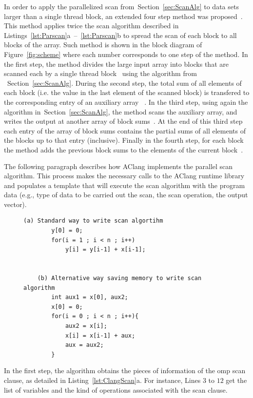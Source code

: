 \documentclass[Ingles]{ic-tese-v1}
\newcommand{\rsec}[1]{Section~\ref{sec:#1}}
\newcommand{\rfig}[1]{Figure~\ref{fig:#1}}
\newcommand{\rlst}[1]{Listing~\ref{lst:#1}}
\newcommand{\rlstn}[3]{Listings~\ref{lst:#1}{#2}~--~\ref{lst:#1}{#3}}
\begin{document}
In order to apply the  parallelized scan from~\rsec{ScanAlg} to data sets
larger than  a single thread block,  an extended four step  method was
proposed~\cite{harris2007parallel}. This method applies twice the  scan
algorithm described in \rlstn{Parscan}{a}{b} to spread the scan of each
block to all blocks  of the array.  Such method is  shown in the block
diagram of \rfig{scheme} where each  number corresponds to one step of
the method.   In the first  step, the  method divides the  large input
array  into  blocks  that  are   scanned  each  by  a  single  thread
block~ using  the algorithm  from ~\rsec{ScanAlg}.   During the
second step,  the total sum  of all elements  of each block  (i.e. the
value in the  last element of the scanned block)  is transfered to the
corresponding entry of  an auxiliary array ~.   In the third
step, using again  the algorithm in~\rsec{ScanAlg}, the  method scans the
auxiliary  array, and  writes the  output  at another  array of  block
sums~.  At  the end  of this  third step  each entry  of the
array of block  sums contains the partial sums of  all elements of the
blocks up to that entry (inclusive).   Finally in the fourth step,
for each block the method adds the previous block sums  to the elements of the current
block~.

The following paragraph describes how AClang implements the parallel scan
algorithm. This process makes the necessary calls to the AClang runtime library
and populates a template that will execute the scan algorithm with the program
data (e.g., type of data to be carried out the scan, the scan operation, the
output vector).

\begin{figure}[t]
	\lstset{basicstyle=\scriptsize}
	\begin{lstlisting}[label=lst:ScanKind, caption={Pseudocode of Scan Parallel implementation in AClang}, escapeinside={}]
	(a) Standard way to write scan algortihm
		y[0] = 0;
		for(i = 1 ; i < n ; i++)
			y[i] = y[i-1] + x[i-1];


	(b) Alternative way saving memory to write scan algorithm
		int aux1 = x[0], aux2;
		x[0] = 0;
		for(i = 0 ; i < n ; i++){
			aux2 = x[i];
			x[i] = x[i-1] + aux;
			aux = aux2;
		}

	\end{lstlisting}
\end{figure}

In the first step, the algorithm obtains the pieces of information of the omp
scan clause, as detailed in \rlst{ClangScan}{a}. For
instance, Lines $3$ to $12$ get the list of variables and the kind of operations
associated with the scan clause.
\end{document}
